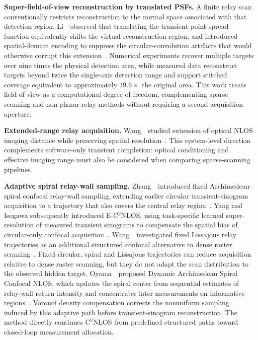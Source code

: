 \vspace{0.8mm}
\noindent \textbf{Super-field-of-view reconstruction by translated PSFs.}
A finite relay scan conventionally restricts reconstruction to the normal space associated with that detection region. Li~\etal~observed that translating the transient point-spread function equivalently shifts the virtual reconstruction region, and introduced spatial-domain encoding to suppress the circular-convolution artifacts that would otherwise corrupt this extension~\cite{liSuperFoVNLOS2026}. Numerical experiments recover multiple targets over nine times the physical detection area, while measured data reconstruct targets beyond twice the single-axis detection range and support stitched coverage equivalent to approximately $19.6\times$ the original area. This work treats field of view as a computational degree of freedom, complementing sparse scanning and non-planar relay methods without requiring a second acquisition aperture.

\vspace{0.8mm}
\noindent \textbf{Extended-range relay acquisition.}
Wang~\etal~studied extension of optical NLOS imaging distance while preserving spatial resolution~\cite{wangExpandedDistanceNLOS2024}. This system-level direction complements software-only transient completion: optical conditioning and effective imaging range must also be considered when comparing sparse-scanning pipelines.

\vspace{0.8mm}
\noindent \textbf{Adaptive spiral relay-wall sampling.}
Zhang~\etal~introduced fixed Archimedean-spiral confocal relay-wall sampling, extending earlier circular transient-sinogram acquisition to a trajectory that also covers the central relay region~\cite{zhangArchimedeanSpiralNLOS2023}. Yang and Isogawa subsequently introduced E-C$^2$NLOS, using task-specific learned super-resolution of measured transient sinograms to compensate the spatial bias of circular-only confocal acquisition~\cite{yangIsogawaSinogramSuperResolution2024}. Wang~\etal~investigated fixed Lissajous relay trajectories as an additional structured confocal alternative to dense raster scanning~\cite{wangLissajousNLOS2025}. Fixed circular, spiral and Lissajous trajectories can reduce acquisition relative to dense raster scanning, but they do not adapt the scan distribution to the observed hidden target. Oyama~\etal~proposed Dynamic Archimedean Spiral Confocal NLOS, which updates the spiral center from sequential estimates of relay-wall return intensity and concentrates later measurements on informative regions~\cite{oyamaAdaptiveSpiralNLOS2026}. Voronoi density compensation corrects the nonuniform sampling induced by this adaptive path before transient-sinogram reconstruction. The method directly continues C$^2$NLOS from predefined structured paths toward closed-loop measurement allocation.


